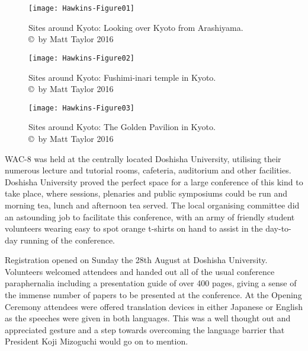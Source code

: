 \documentclass[spanish]{ijsra}
\begin{document}
\begin{figure}[!htb] %
	\centering
	\texttt{[image: Hawkins-Figure01]}
	\caption{Sites around Kyoto: Looking over Kyoto from Arashiyama.  
		{\normalfont\scriptsize \\ \copyright\ by Matt Taylor 2016}}
	\label{fig:Hawkins-Figure01}
\end{figure}

\begin{figure}[!htb] %
	\centering
	\texttt{[image: Hawkins-Figure02]}
	\caption{Sites around Kyoto: Fushimi-inari temple in Kyoto. 
		{\normalfont\scriptsize \\ \copyright\ by Matt Taylor 2016}}
	\label{fig:Hawkins-Figure02}
\end{figure}

\begin{figure}[!htb] %
	\centering
	\texttt{[image: Hawkins-Figure03]}
	\caption{Sites around Kyoto: The Golden Pavilion in Kyoto. 
		{\normalfont\scriptsize \\ \copyright\ by Matt Taylor 2016}}
	\label{fig:Hawkins-Figure03}
\end{figure}
  
WAC-8 was held at the centrally located Doshisha University, utilising their numerous lecture and tutorial rooms, cafeteria, auditorium and other facilities. Doshisha University proved the perfect space for a large conference of this kind to take place, where sessions, plenaries and public symposiums could be run and morning tea, lunch and afternoon tea served. The local organising committee did an astounding job to facilitate this conference, with an army of friendly student volunteers wearing easy to spot orange t-shirts on hand to assist in the day-to-day running of the conference. 

Registration opened on Sunday the 28th August at Doshisha University. Volunteers welcomed attendees and handed out all of the usual conference paraphernalia including a presentation guide of over \num{400} pages, giving a sense of the immense number of papers to be presented at the conference. At the Opening Ceremony attendees were offered translation devices in either Japanese or English as the speeches were given in both languages. This was a well thought out and appreciated gesture and a step towards overcoming the language barrier that President Koji Mizoguchi would go on to mention. 
\end{document}
